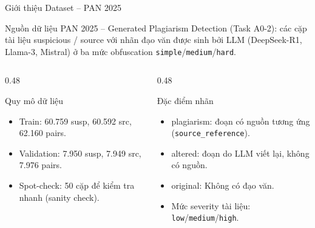 \documentclass[aspectratio=169,11pt]{beamer}
\def\textbf#1{#1}%
\begin{document}
\begin{frame}{Giới thiệu Dataset -- PAN 2025}
\begin{block}{Nguồn dữ liệu}
\small
\textbf{PAN 2025 -- Generated Plagiarism Detection} (Task A0-2): các cặp tài liệu \textbf{suspicious / source} với nhãn đạo văn được sinh bởi LLM (DeepSeek-R1, Llama-3, Mistral) ở ba mức obfuscation \texttt{simple}/\texttt{medium}/\texttt{hard}.
\end{block}

\vspace{0.2cm}
\begin{columns}[T]
\begin{column}{0.48\textwidth}
\begin{block}{Quy mô dữ liệu}
\begin{itemize}
  \item[\ding{51}] \textbf{Train:} 60.759 susp, 60.592 src, 62.160 pairs.
  \item[\ding{51}] \textbf{Validation:} 7.950 susp, 7.949 src, 7.976 pairs.
  \item[\ding{51}] \textbf{Spot-check:} 50 cặp để kiểm tra nhanh (sanity check).
\end{itemize}
\end{block}
\end{column}

\begin{column}{0.48\textwidth}
\begin{block}{Đặc điểm nhãn}
\begin{itemize}
  \item[\ding{51}] \textbf{plagiarism:} đoạn có nguồn tương ứng (\texttt{source\_reference}).
  \item[\ding{51}] \textbf{altered:} đoạn do LLM viết lại, không có nguồn.
  \item[\ding{51}] \textbf{original:} Không có đạo văn.
  \item[\ding{51}] Mức \textbf{severity} tài liệu: \texttt{low}/\texttt{medium}/\texttt{high}.
\end{itemize}
\end{block}
\end{column}
\end{columns}
\end{frame}
\end{document}
